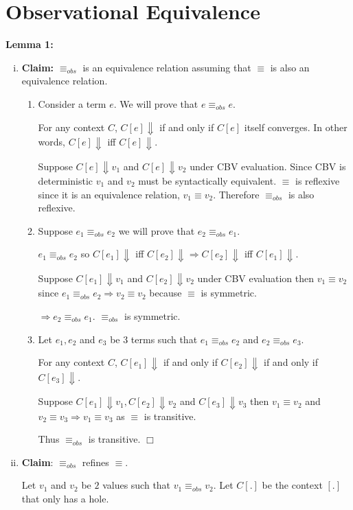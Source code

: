 \documentclass[10pt]{article}
\newcommand{\problem}[1]{\section{\sf #1}}
\begin{document}
\problem{Observational Equivalence}

\textbf{Lemma 1:}
\begin{enumerate}[(i)]
\item \textbf{Claim: } $\equiv_{obs}$ is an equivalence relation assuming that $\equiv$ is also an equivalence relation.

\begin{enumerate}
\item Consider a term $e$. We will prove that $e \equiv_{obs} e$.

For any context $C$, $C[e] \Downarrow$ if and only if $C[e]$ itself converges. In other words,  $C[e] \Downarrow$ iff  $C[e] \Downarrow$.

Suppose $C[e] \Downarrow v_1$ and $C[e] \Downarrow v_2$ under CBV evaluation. Since CBV is deterministic $v_1$ and $v_2$ must be syntactically equivalent. $\equiv$ is reflexive since it is an equivalence relation, $v_1 \equiv v_2$. Therefore $\equiv_{obs}$ is also reflexive.
\item Suppose $e_1 \equiv_{obs} e_2$ we will prove that $e_2 \equiv_{obs} e_1$.

$e_1 \equiv_{obs} e_2$ so $C[e_1] \Downarrow$ iff $C[e_2] \Downarrow \Rightarrow C[e_2] \Downarrow$ iff $C[e_1] \Downarrow$.

Suppose $C[e_1] \Downarrow v_1$ and $C[e_2] \Downarrow v_2$ under CBV evaluation then $v_1 \equiv v_2$ since $e_1 \equiv_{obs} e_2 \Rightarrow v_2 \equiv v_2$ because $\equiv$ is symmetric.

$\Rightarrow e_2 \equiv_{obs} e_1$. $\equiv_{obs}$ is symmetric.
\item Let $e_1, e_2$ and $e_3$ be $3$ terms such that $e_1 \equiv_{obs} e_2$ and $e_2 \equiv_{obs} e_3$.

For any context $C$, $C[e_1] \Downarrow$ if and only if $C[e_2] \Downarrow$ if and only if $C[e_3] \Downarrow$.

Suppose $C[e_1] \Downarrow v_1, C[e_2] \Downarrow v_2$ and $C[e_3] \Downarrow v_3$ then $v_1 \equiv v_2$ and $v_2 \equiv v_3 \Rightarrow v_1 \equiv v_3$ as $\equiv$ is transitive.

Thus $\equiv_{obs}$ is transitive. $\Box$
\end{enumerate}
\item \textbf{Claim}: $\equiv_{obs}$ refines $\equiv$.

Let $v_1$ and $v_2$ be $2$ values such that $v_1 \equiv_{obs} v_2$. Let $C[.]$ be the context $[.]$ that only has a hole.


\end{enumerate}
\end{document}
